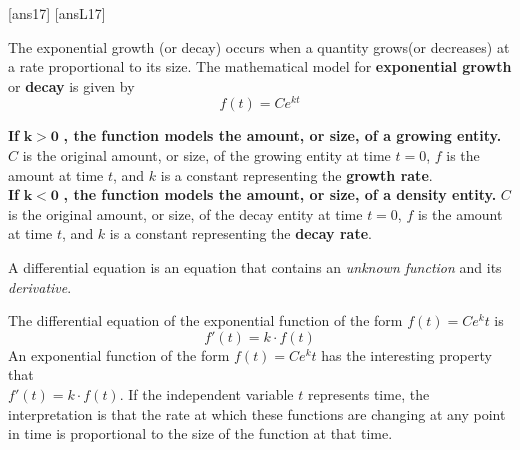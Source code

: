 \newpage
[ans17]
[ansL17]

\begin{tcolorbox}[title = {Exponential Growth and Decay Models}]

\noindent The exponential growth (or decay) occurs when a quantity grows(or decreases) at a rate proportional to its size. The mathematical model for \textbf{exponential growth} or \textbf{decay} is given by
\vspace{-0.2cm}
\begin{equation}
    f(t) = Ce^{kt}
\end{equation}

\textbf{If} $\bm{k>0}$ \textbf{, the function models the amount, or size, of a growing entity.} $C$ is the original amount, or size, of the growing entity at time $t=0$, $f$ is the amount at time $t$, and $k$ is a constant representing the \textbf{growth rate}.\\

\textbf{If} $\bm{k<0}$ \textbf{, the function models the amount, or size, of a density entity.} $C$ is the original amount, or size, of the decay entity at time $t=0$, $f$ is the amount at time $t$, and $k$ is a constant representing the \textbf{decay rate}.

\end{tcolorbox}
\vspace{0.5 in}
\begin{tcolorbox}[title = {Differential Equation}]
A differential equation is an equation that contains an \emph{unknown function} and its \emph{derivative}.
\end{tcolorbox}
\vspace{2 in}
\begin{tcolorbox}[title = {Differential Equation of Exponential Growth and Decay Models}]
The differential equation of the exponential function of the form $f(t)=Ce^kt$ is
$$f'(t)=k\cdot f(t)$$
\noindent An exponential function of the form $f(t)=Ce^kt$ has the interesting property that\\ $f'(t)=k\cdot f(t)$.  If the independent variable $t$ represents time, the interpretation is that the rate at which these functions are changing at any point in time is proportional to the size of the function at that time.  %
\end{tcolorbox}


